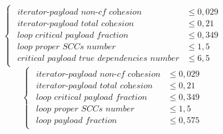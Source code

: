 \begin{equation*}
\begin{cases}
\begin{aligned}
\textit{iterator-payload non-cf cohesion}            &\le 0,029 \\[1ex]
\textit{iterator-payload total cohesion} &\leq 0,21 \\[1ex]
\textit{loop critical payload fraction} &\leq 0,349 \\[1ex]
\textit{loop proper SCCs number} &\leq 1,5 \\[1ex]
\textit{critical payload true dependencies number} &\leq 6,5
\end{aligned}
\end{cases}
\end{equation*}\newline
\begin{equation*}
\begin{cases}
\begin{aligned}
\textit{iterator-payload non-cf cohesion}            &\le 0,029 \\[1ex]
\textit{iterator-payload total cohesion} &\leq 0,21 \\[1ex]
\textit{loop critical payload fraction} &\leq 0,349 \\[1ex]
\textit{loop proper SCCs number} &\leq 1,5 \\[1ex]
\textit{loop payload fraction} &\leq 0,575
\end{aligned}
\end{cases}
\end{equation*}\newline
    

